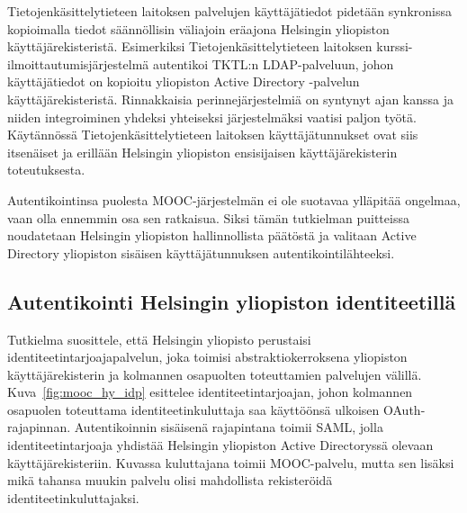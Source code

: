 \documentclass[finnish,gradu]{tktltiki}
\begin{document}
  Tietojenkäsittelytieteen laitoksen palvelujen käyttäjätiedot pidetään synkronissa kopioimalla tiedot säännöllisin väliajoin eräajona Helsingin yliopiston käyttäjärekisteristä. Esimerkiksi Tietojenkäsittelytieteen laitoksen kurssi-ilmoittautumisjärjestelmä autentikoi TKTL:n LDAP-palveluun, johon käyttäjätiedot on kopioitu yliopiston Active Directory -palvelun käyttäjärekisteristä. Rinnakkaisia perinnejärjestelmiä on syntynyt ajan kanssa ja niiden integroiminen yhdeksi yhteiseksi järjestelmäksi vaatisi paljon työtä. Käytännössä Tietojenkäsittelytieteen laitoksen käyttäjätunnukset ovat siis itsenäiset ja erillään Helsingin yliopiston ensisijaisen käyttäjärekisterin toteutuksesta.

  Autentikointinsa puolesta MOOC-järjestelmän ei ole suotavaa ylläpitää ongelmaa, vaan olla ennemmin osa sen ratkaisua. Siksi tämän tutkielman puitteissa noudatetaan Helsingin yliopiston hallinnollista päätöstä ja valitaan Active Directory yliopiston sisäisen käyttäjätunnuksen autentikointilähteeksi.

  \subsection{Autentikointi Helsingin yliopiston identiteetillä} %
  \label{sub:autentikointi_helsingin_yliopiston_identiteetillä}

  Tutkielma suosittele, että Helsingin yliopisto perustaisi identiteetintarjoajapalvelun, joka toimisi abstraktiokerroksena yliopiston käyttäjärekisterin ja kolmannen osapuolten toteuttamien palvelujen välillä.  Kuva~\ref{fig:mooc_hy_idp} esittelee identiteetintarjoajan, johon kolmannen osapuolen toteuttama identiteetinkuluttaja saa käyttöönsä ulkoisen OAuth-rajapinnan. Autentikoinnin sisäisenä rajapintana toimii SAML, jolla identiteetintarjoaja yhdistää Helsingin yliopiston Active Directoryssä olevaan käyttäjärekisteriin. Kuvassa kuluttajana toimii MOOC-palvelu, mutta sen lisäksi mikä tahansa muukin palvelu olisi mahdollista rekisteröidä identiteetinkuluttajaksi.
\end{document}
